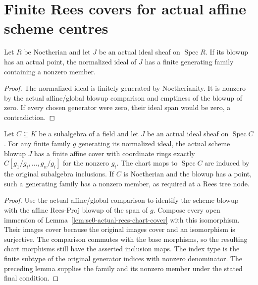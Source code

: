 \section{Finite Rees covers for actual affine scheme centres}

\begin{lemma}\label{lem:sc0-affine-centre-finite-generators}
\leanok
{}
Let $R$ be Noetherian and let $J$ be an actual ideal sheaf on $\operatorname{Spec}R$.
If its blowup has an actual point, the normalized ideal of $J$ has a finite generating
family containing a nonzero member.
\end{lemma}
\begin{proof}
The normalized ideal is finitely generated by Noetherianity. It is nonzero by the actual
affine/global blowup comparison and emptiness of the blowup of zero. If every chosen generator
were zero, their ideal span would be zero, a contradiction.
\end{proof}

\begin{lemma}\label{lem:sc0-global-affine-rees-cover}
\leanok
{}
Let $C\subseteq K$ be a subalgebra of a field and let $J$ be an actual ideal sheaf on
$\operatorname{Spec}C$. For any finite family $g$ generating its normalized ideal, the actual
scheme blowup $J$ has a finite affine cover with coordinate rings exactly
$C[g_1/g_i,\ldots,g_n/g_i]$ for the nonzero $g_i$. The chart maps to $\operatorname{Spec}C$
are induced by the original subalgebra inclusions. If $C$ is Noetherian and the blowup has a
point, such a generating family has a nonzero member, as required at a Rees tree node.
\end{lemma}
\begin{proof}
Use the actual affine/global comparison to identify the scheme blowup with the affine
Rees-Proj blowup of the span of $g$. Compose every open immersion of
Lemma~\ref{lem:sc0-actual-rees-chart-cover} with this isomorphism. Their images cover because
the original images cover and an isomorphism is surjective. The comparison commutes with
the base morphisms, so the resulting chart morphisms still have the asserted inclusion maps.
The index type is the finite subtype of the original generator indices with nonzero denominator.
The preceding lemma supplies the family and its nonzero member under the stated final condition.
\end{proof}
